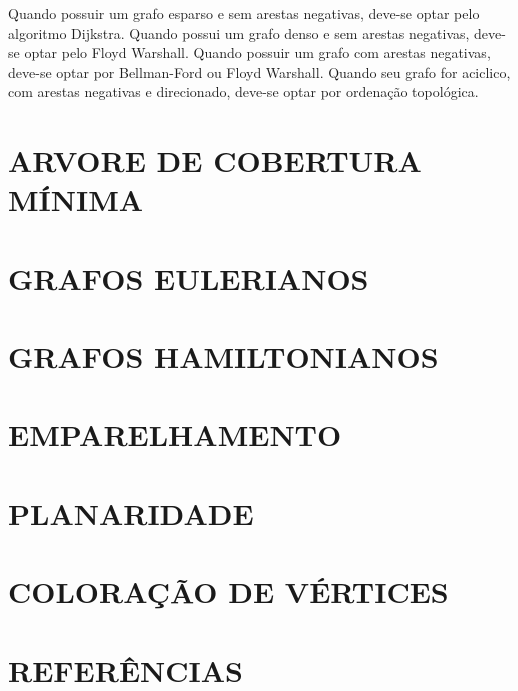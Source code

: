 	Quando possuir um grafo esparso e sem arestas negativas, deve-se optar pelo algoritmo Dijkstra. Quando possui um grafo denso e sem arestas negativas, deve-se optar pelo Floyd Warshall. Quando possuir um grafo com arestas negativas, deve-se optar por Bellman-Ford ou Floyd Warshall. Quando seu grafo for aciclico, com arestas negativas e direcionado, deve-se optar por ordenação topológica.

\chapter{ARVORE DE COBERTURA MÍNIMA}\label{cap:arvCobMinima}


\chapter{GRAFOS EULERIANOS}\label{cap:grafosEulerianos}


\chapter{GRAFOS HAMILTONIANOS}\label{cap:grafosHamiltonianos}


\chapter{EMPARELHAMENTO}\label{cap:emparelhamento}


\chapter{PLANARIDADE}\label{cap:planaridade}


\chapter{COLORAÇÃO DE VÉRTICES}\label{cap:coloracaoVertices}


\clearpage
\chapter*{REFERÊNCIAS}
\vspace{-0.5em}
\nocite{*}
\printbibliography[heading=none]


